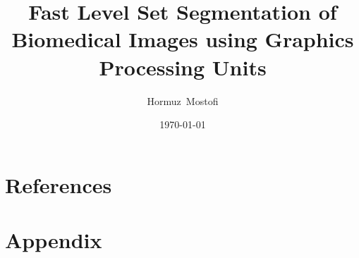 \documentclass[a4paper]{report}
\begin{document}
\title{Fast Level Set Segmentation of Biomedical Images using Graphics Processing Units}
\author{Hormuz~Mostofi}
\date{\today}
\maketitle

\setcounter{tocdepth}{1}
\tableofcontents








\chapter{References}

\chapter{Appendix}





\end{document}
